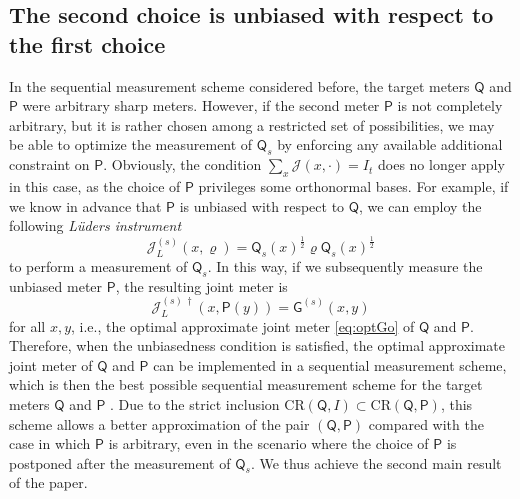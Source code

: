 \documentclass[12pt,reqno]{amsart}
\theoremstyle{definition}
\newcommand{\Qo}{\mathsf{Q}}%
\newcommand{\Po}{\mathsf{P}}%
\newcommand{\Go}{\mathsf{G}}%
\newcommand{\rhoo}{\varrho} %
\newcommand{\ii}{\mathcal{J}}
\newcommand{\CR}[1]{\textrm{CR} #1} %
\begin{document}

\subsection{The second choice is unbiased with respect to the first choice}\label{sec:s2}

In the sequential measurement scheme considered before, the target meters $\Qo$ and $\Po$ were arbitrary sharp meters. However, if the second meter $\Po$ is not completely arbitrary, but it is rather chosen among a restricted set of possibilities, we may be able to optimize the measurement of $\Qo_s$ by enforcing any available additional constraint on $\Po$. 
Obviously, the condition $\sum_x \ii(x,\cdot) = I_t$ does no longer apply in this case, as the choice of $\Po$ privileges some orthonormal bases. For example, if we know in advance that $\Po$ is unbiased with respect to $\Qo$, we can employ the following {\em L\"uders instrument}
\begin{equation}\label{eq:Luders}
\ii_L^{(s)}(x,\rhoo) = \Qo_s(x)^{\frac{1}{2}} \rhoo \Qo_s(x)^{\frac{1}{2}}
\end{equation}
to perform a measurement of $\Qo_s$. In this way, if we subsequently measure the unbiased meter $\Po$, the resulting joint meter is 
\begin{equation}\label{eq:Luders+P}
\ii_L^{(s)\,\dag}(x,\Po(y)) = \Go^{(s)}(x,y)
\end{equation}
for all $x,y$, i.e., the optimal approximate joint meter \eqref{eq:optGo} of $\Qo$ and $\Po$. 
Therefore, when the unbiasedness condition is satisfied, the optimal approximate joint meter of $\Qo$ and $\Po$ can be implemented in a sequential measurement scheme, which is then the best possible sequential measurement scheme for the target meters $\Qo$ and $\Po$ \cite{CaCaTo19}. Due to the strict inclusion $\CR{(\Qo,I)}\subset\CR{(\Qo,\Po)}$, this scheme allows a better approximation of the pair $(\Qo,\Po)$ compared with the case in which $\Po$ is arbitrary, even in the scenario where the choice of $\Po$ is postponed after the measurement of $\Qo_s$. We thus achieve the second main result of the paper.
\end{document}
